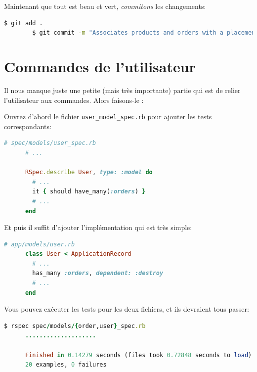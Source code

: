 \documentclass[]{report}
\begin{document}
      Maintenant que tout est beau et vert, \textit{commitons} les changements:

      \begin{scriptsize}
        \begin{lstlisting}[language=bash]
        $ git add .
        $ git commit -m "Associates products and orders with a placements model"
        \end{lstlisting}
      \end{scriptsize}

  \section{Commandes de l'utilisateur}

    Il nous manque juste une petite (mais très importante) partie qui est de relier l'utilisateur aux commandes. Alors faisons-le :

    Ouvrez d'abord le fichier \verb|user_model_spec.rb| pour ajouter les tests correspondants:

    \begin{scriptsize}
      \begin{lstlisting}[language=ruby]
      # spec/models/user_spec.rb
      # ...

      RSpec.describe User, type: :model do
        # ...
        it { should have_many(:orders) }
        # ...
      end
      \end{lstlisting}
    \end{scriptsize}

    Et puis il suffit d'ajouter l'implémentation qui est très simple:

    \begin{scriptsize}
      \begin{lstlisting}[language=ruby]
      # app/models/user.rb
      class User < ApplicationRecord
        # ...
        has_many :orders, dependent: :destroy
        # ...
      end
      \end{lstlisting}
    \end{scriptsize}

    Vous pouvez exécuter les tests pour les deux fichiers, et ils devraient tous passer:

    \begin{scriptsize}
      \begin{lstlisting}[language=ruby]
      $ rspec spec/models/{order,user}_spec.rb
      ....................

      Finished in 0.14279 seconds (files took 0.72848 seconds to load)
      20 examples, 0 failures
      \end{lstlisting}
    \end{scriptsize}
\end{document}
